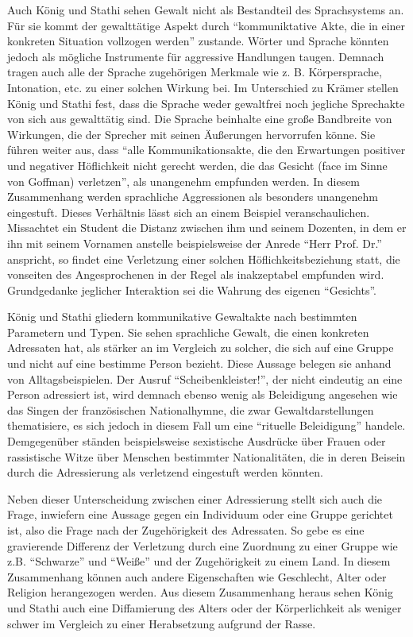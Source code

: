 Auch König und Stathi sehen Gewalt nicht als Bestandteil des Sprachsystems an.
Für sie kommt der gewalttätige Aspekt durch "`kommuniktative Akte, die in einer konkreten Situation vollzogen werden"' zustande.
Wörter und Sprache könnten jedoch als mögliche Instrumente für aggressive Handlungen taugen.
Demnach tragen auch alle der Sprache zugehörigen Merkmale wie z. B. Körpersprache, Intonation, etc. zu einer solchen Wirkung bei.
Im Unterschied zu Krämer stellen König und Stathi fest, dass die Sprache weder gewaltfrei noch jegliche Sprechakte von sich aus gewalttätig sind.
Die Sprache beinhalte eine große Bandbreite von Wirkungen, die der Sprecher mit seinen Äußerungen hervorrufen könne.
Sie führen weiter aus, dass "`alle Kommunikationsakte, die den Erwartungen positiver und negativer Höflichkeit nicht gerecht werden, die das Gesicht (face im Sinne von Goffman) verletzen"', als unangenehm empfunden werden.
In diesem Zusammenhang werden sprachliche Aggressionen als besonders unangenehm eingestuft.
Dieses Verhältnis lässt sich an einem Beispiel veranschaulichen.
Missachtet ein Student die Distanz zwischen ihm und seinem Dozenten, in dem er ihn mit seinem Vornamen anstelle beispielsweise der Anrede "`Herr Prof. Dr."' anspricht, so findet eine Verletzung einer solchen Höflichkeitsbeziehung statt, die vonseiten des Angesprochenen in der Regel als inakzeptabel empfunden wird.
Grundgedanke jeglicher Interaktion sei die Wahrung des eigenen "`Gesichts"'.

König und Stathi gliedern kommunikative Gewaltakte nach bestimmten Parametern und Typen.
Sie sehen sprachliche Gewalt, die einen konkreten Adressaten hat, als stärker an im Vergleich zu solcher, die sich auf eine Gruppe und nicht auf eine bestimme Person bezieht.
Diese Aussage belegen sie anhand von Alltagsbeispielen.
Der Ausruf "`Scheibenkleister!"', der nicht eindeutig an eine Person adressiert ist, wird demnach ebenso wenig als Beleidigung angesehen wie das Singen der französischen Nationalhymne, die zwar Gewaltdarstellungen thematisiere, es sich jedoch in diesem Fall um eine "`rituelle Beleidigung"' handele.
Demgegenüber ständen beispielsweise sexistische Ausdrücke über Frauen oder rassistische Witze über Menschen bestimmter Nationalitäten, die in deren Beisein durch die Adressierung als verletzend eingestuft werden könnten.

Neben dieser Unterscheidung zwischen einer Adressierung stellt sich auch die Frage, inwiefern eine Aussage gegen ein Individuum oder eine Gruppe gerichtet ist, also die Frage nach der Zugehörigkeit des Adressaten.
So gebe es eine gravierende Differenz der Verletzung durch eine Zuordnung zu einer Gruppe wie z.B. "`Schwarze"' und "`Weiße"' und der Zugehörigkeit zu einem Land.
In diesem Zusammenhang können auch andere Eigenschaften wie Geschlecht, Alter oder Religion herangezogen werden.
Aus diesem Zusammenhang heraus sehen König und Stathi auch eine Diffamierung des Alters oder der Körperlichkeit als weniger schwer im Vergleich zu einer Herabsetzung aufgrund der Rasse.

